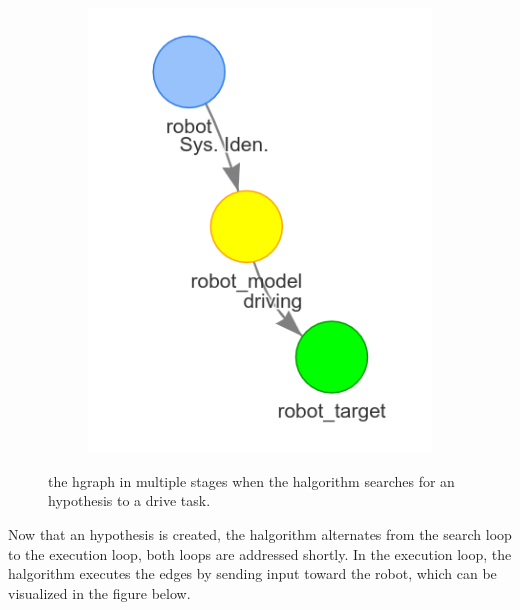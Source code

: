\begin{figure}[h]
\begin{subfigure}{.3\textwidth}
    \end{subfigure}
    \begin{subfigure}{.3\textwidth}
    \centering
    \includegraphics[width=\textwidth]{figures/proposed_method/connecting_nodes/robot_to_target/robot_iden_drive_target}
    \end{subfigure}
    \caption{the \ac{hgraph} in multiple stages when the \ac{halgorithm} searches for an hypothesis to a drive task.}%
    \label{fig:robot_drive_hgraph}
\end{figure}

Now that an hypothesis is created, the \ac{halgorithm} alternates from the search loop to the execution loop, both loops are addressed shortly. In the execution loop, the \ac{halgorithm} executes the edges by sending input toward the robot, which can be visualized in the figure below.\bs

